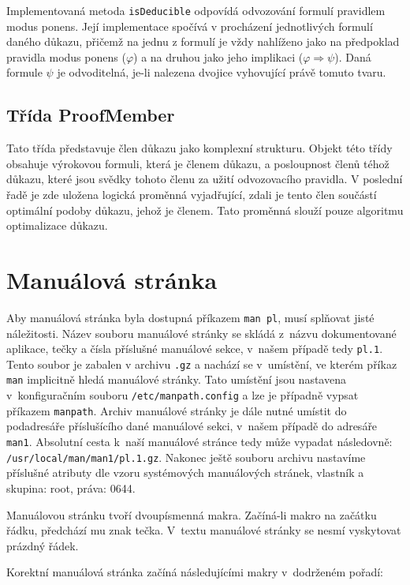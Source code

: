 \documentclass[thesis=B,czech,hidelinks]{thesis}[2012/06/26]
\begin{document}
Implementovaná metoda \texttt{isDeducible} odpovídá odvozování formulí pravidlem modus ponens. Její implementace spočívá v procházení jednotlivých formulí daného důkazu, přičemž na jednu z formulí je vždy nahlíženo jako na předpoklad pravidla modus ponens ($\varphi$) a na druhou jako jeho implikaci ($\varphi \Rightarrow \psi$). Daná formule $\psi$ je odvoditelná, je-li nalezena dvojice vyhovující právě tomuto tvaru.

\subsection{Třída ProofMember}

Tato třída představuje člen důkazu jako komplexní strukturu. Objekt této třídy obsahuje výrokovou formuli, která je členem důkazu, a posloupnost členů téhož důkazu, které jsou svědky tohoto členu za užití odvozovacího pravidla. V poslední řadě je zde uložena logická proměnná vyjadřující, zdali je tento člen součástí optimální podoby důkazu, jehož je členem. Tato proměnná slouží pouze algoritmu optimalizace důkazu.

\section{Manuálová stránka}

Aby manuálová stránka byla dostupná příkazem \texttt{man pl}, musí splňovat jisté náležitosti. Název souboru manuálové stránky se skládá z~názvu dokumentované aplikace, tečky a čísla příslušné manuálové sekce, v~našem případě tedy \texttt{pl.1}. Tento soubor je zabalen v archivu \texttt{.gz} a nachází se v~umístění, ve kterém příkaz \texttt{man} implicitně hledá manuálové stránky. Tato umístění jsou nastavena v~konfiguračním souboru \texttt{/etc/manpath.config} a lze je případně vypsat příkazem \texttt{manpath}. Archiv manuálové stránky je dále nutné umístit do podadresáře příslušícího dané manuálové sekci, v~našem případě do adresáře \texttt{man1}. Absolutní cesta k~naší manuálové stránce tedy může vypadat následovně: \texttt{/usr/local/man/man1/pl.1.gz}. Nakonec ještě souboru archivu nastavíme příslušné atributy dle vzoru systémových manuálových stránek, vlastník a skupina: root, práva: 0644.

Manuálovou stránku tvoří dvoupísmenná makra. Začíná-li makro na začátku řádku, předchází mu znak tečka. V~textu manuálové stránky se nesmí vyskytovat prázdný řádek.

Korektní manuálová stránka začíná následujícími makry v~dodrženém pořadí:
\end{document}
